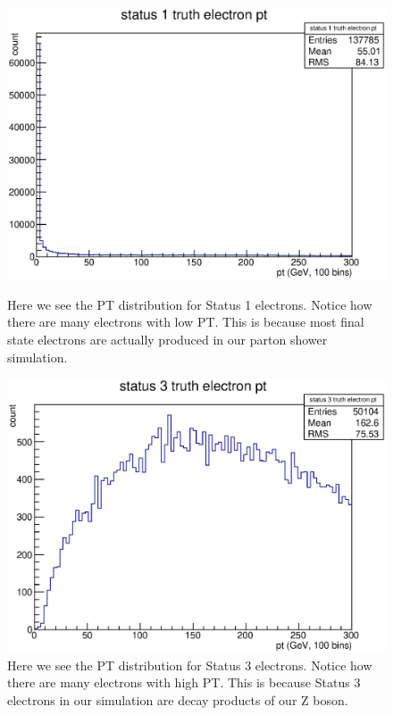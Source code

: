 \documentclass{article}
\begin{document}
\begin{figure}[h]
\begin{minipage}{0.45\textwidth}
	\centering
	\includegraphics[width = \linewidth]{truth_electron_1_pt.eps}
	\caption{Here we see the PT distribution for Status 1 electrons. Notice how there are many electrons with low PT. This is because most final state electrons are actually produced in our parton shower simulation.}
	\label{fig:truthElectron1PT}
\end{minipage}
\hspace{0.1\textwidth}
\begin{minipage}{0.45\textwidth}
	\centering
	\includegraphics[width = \linewidth]{truth_electron_3_pt.eps}
	\caption{Here we see the PT distribution for Status 3 electrons. Notice how there are many electrons with high PT. This is because Status 3 electrons in our simulation are decay products of our Z boson.}
	\label{fig:truthElectron3PT}
\end{minipage}
\end{figure}
\end{document}
